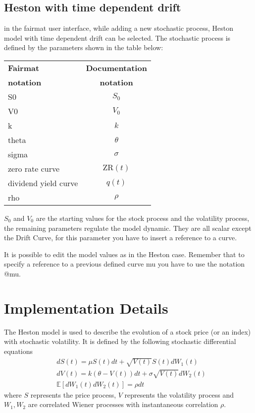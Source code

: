 \subsection{Heston with time dependent drift}
in the fairmat user interface, while adding a new stochastic process, Heston model with time dependent drift can be selected.
The stochastic process is defined by the parameters shown in the table below:
\begin{center}
\begin{tabular}{|l|c|}
  \hline
\textbf{Fairmat}&\textbf{Documentation}\\
\textbf{notation}&\textbf{notation}\\
                     \hline
 S0     & $S_0$\\
 V0     & $V_0$\\
 k      & $k$ \\
 theta  & $\theta$\\
 sigma  & $\sigma$\\
 zero rate curve    & $\mathrm{ZR}(t)$\\
 dividend yield curve    & $q(t)$\\
rho & $\rho$ \\ 
   \hline
\end{tabular}
\end{center}
$S_0$ and $V_0$ are the starting values for the stock process and the volatility process, the remaining parameters regulate the model dynamic. They are all scalar except the Drift Curve, for this parameter you have to insert a reference to a curve.

It is possible to edit the model values as in the Heston case. Remember that to specify a reference to a previous defined curve {\ttfamily mu} you have to use the notation {\ttfamily @mu}.

\section{Implementation Details}

The Heston model is used to describe the evolution of a stock price (or an index) with stochastic volatility. It is defined by the following stochastic differential equations
\begin{align}
& dS(t) = \mu S(t)dt + \sqrt{V(t)}S(t)dW_1(t)\label{eq:dsh}\\
& dV(t) = k(\theta - V(t))dt + \sigma\sqrt{V(t)}dW_2(t)\\
& \mathbb{E}[dW_1(t)dW_2(t)] = \rho dt
\end{align}
where $S$ represents the price process, $V$ represents the volatility process and $W_1, W_2$ are correlated Wiener processes with instantaneous correlation $\rho$.

